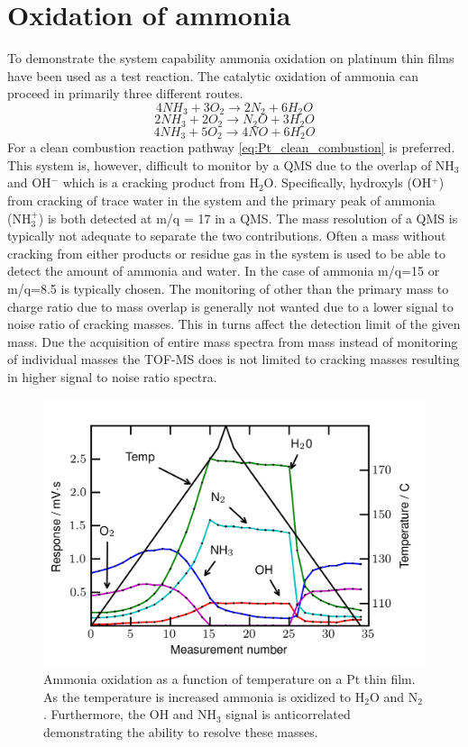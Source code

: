 \documentclass[aip,rsi]{revtex4-1}
\begin{document}
\section{Oxidation of ammonia}
To demonstrate the system capability ammonia oxidation on platinum thin films have been used as a test reaction. The catalytic oxidation of ammonia can proceed in primarily three different routes.
\begin{equation}
4NH_3+3O_2\rightarrow 2N_2 + 6H_2O
\label{eq:Pt_clean_combustion}
\end{equation}
\begin{equation}
2NH_3+2O_2\rightarrow N_2O + 3H_2O
\end{equation}
\begin{equation}
4NH_3+5O_2\rightarrow 4NO + 6H_2O
\end{equation}
For a clean combustion reaction pathway \ref{eq:Pt_clean_combustion} is preferred. This system is, however, difficult to monitor by a QMS due to the overlap of NH$_3$ and OH$^-$ which is a cracking product from H$_2$O. Specifically, hydroxyls (OH$^{+}$) from cracking of trace water in the system and the primary peak of ammonia (NH$_{3}^{+}$) is both detected at m/q = 17 in a QMS. The mass resolution of a QMS is typically not adequate to separate the two contributions. Often a mass without cracking from either products or residue gas in the system is used to be able to detect the amount of ammonia and water. In the case of ammonia m/q=15 or m/q=8.5 is typically chosen. The monitoring of other than the primary mass to charge ratio due to mass overlap is generally not wanted due to a lower signal to noise ratio of cracking masses. This in turns affect the detection limit of the given mass. Due the acquisition of entire mass spectra from mass instead of monitoring of individual masses the TOF-MS does is not limited to cracking masses resulting in higher signal to noise ratio spectra.
\begin{figure}
 \includegraphics[width=14cm]{ammonia_reactivity.png}%
 \caption{Ammonia oxidation as a function of temperature on a Pt thin film. As the temperature is increased ammonia is oxidized to H$_2$O and N$_2$. Furthermore, the OH and NH$_3$ signal is anticorrelated demonstrating the ability to resolve these masses.\label{fig:ammonia_reactivity}}%
\end{figure}
\end{document}

